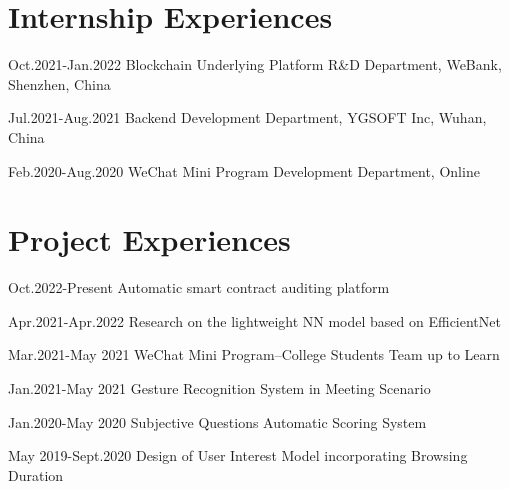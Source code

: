 \documentclass[12pt,letterpaper]{report}
\newcommand{\listitemspace}{0.25em}
\renewenvironment{itemize}
{\begin{list}{}{\setlength{\leftmargin}{0em}
                \setlength{\parskip}{0em}
                \setlength{\itemsep}{\listitemspace}
                \setlength{\parsep}{\listitemspace}}}
{\end{list}}
\begin{document}
    \section*{Internship Experiences}
    \begin{tablist}
        \item[Oct.2021-Jan.2022] \tab{}Blockchain Underlying Platform R\&D Department, WeBank, Shenzhen, China
        \item[Jul.2021-Aug.2021] \tab{}Backend Development Department, YGSOFT Inc, Wuhan, China
        \item[Feb.2020-Aug.2020] \tab{}WeChat Mini Program Development Department, Online 
    \end{tablist}

    \section*{Project Experiences}
    \begin{tablist}
        \item[Oct.2022-Present] \tab{}Automatic smart contract auditing platform
        \item[Apr.2021-Apr.2022] \tab{}Research on the lightweight NN model based on EfficientNet
        \item[Mar.2021-May 2021] \tab{}WeChat Mini Program--College Students Team up to Learn
        \item[Jan.2021-May 2021] \tab{}Gesture Recognition System in Meeting Scenario
        \item[Jan.2020-May 2020] \tab{}Subjective Questions Automatic Scoring System
        \item[May 2019-Sept.2020] Design of User Interest Model incorporating Browsing Duration
    \end{tablist}

\end{document}
